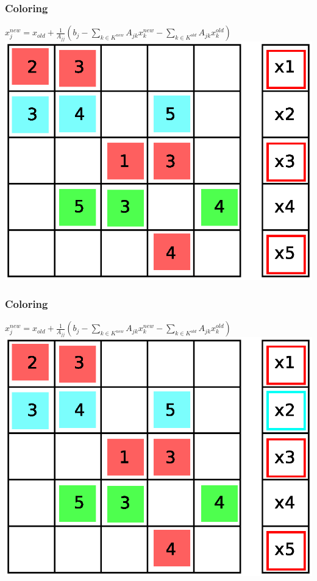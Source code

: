 \documentclass{beamer}
\begin{document}
\begin{frame}
\frametitle{Coloring}
$ x_j^{new} = x_{old} + \frac{1}{A_{jj}} \left(b_{j} - \sum_{k \in K^{new}}A_{jk}
 x_k^{new} - \sum_{k \in K^{old}}A_{jk} x_k^{old}\right)$
\includegraphics[width=0.8\linewidth]{graphic/coloringGS12.eps}
\end{frame}

\begin{frame}
\frametitle{Coloring}
$ x_j^{new} = x_{old} + \frac{1}{A_{jj}} \left(b_{j} - \sum_{k \in K^{new}}A_{jk}
 x_k^{new} - \sum_{k \in K^{old}}A_{jk} x_k^{old}\right)$
\includegraphics[width=0.8\linewidth]{graphic/coloringGS13.eps}
\end{frame}
\end{document}
